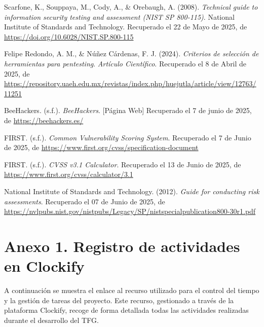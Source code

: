 \documentclass[a4paper, 11pt]{article}
\begin{document}
\begin{thebibliography}{99}
    Scarfone, K., Souppaya, M., Cody, A., \& Orebaugh, A. (2008). \textit{Technical guide to information security testing and assessment (NIST SP 800-115)}. National Institute of Standards and Technology. Recuperado el 22 de Mayo de 2025, de \url{https://doi.org/10.6028/NIST.SP.800-115}

    Felipe Redondo, A. M., \& Núñez Cárdenas, F. J. (2024). \textit{Criterios de selección de herramientas para pentesting}. \textit{Artículo Científico}. Recuperado el 8 de Abril de 2025, de \url{https://repository.uaeh.edu.mx/revistas/index.php/huejutla/article/view/12763/11251}
   
    BeeHackers. (s.f.). \textit{BeeHackers}. [Página Web] Recuperado el 7 de junio de 2025, de \url{https://beehackers.es/}

    FIRST. (s.f.). \textit{Common Vulnerability Scoring System}. Recuperado el 7 de Junio de 2025, de \url{https://www.first.org/cvss/specification-document}

    FIRST. (s.f.). \textit{CVSS v3.1 Calculator}. Recuperado el 13 de Junio de 2025, de \url{https://www.first.org/cvss/calculator/3.1}

    National Institute of Standards and Technology. (2012). \textit{Guide for conducting risk assessments}.  Recuperado el 07 de Junio de 2025, de \url{https://nvlpubs.nist.gov/nistpubs/Legacy/SP/nistspecialpublication800-30r1.pdf}


\end{thebibliography}


\clearpage







\thispagestyle{nohead}
\section*{Anexo 1. Registro de actividades en Clockify}
\label{anexo:1}

A continuación se muestra el enlace al recurso utilizado para el control del tiempo y la gestión de tareas del proyecto. Este recurso, gestionado a través de la plataforma Clockify, recoge de forma detallada todas las actividades realizadas durante el desarrollo del TFG. 
\end{document}
